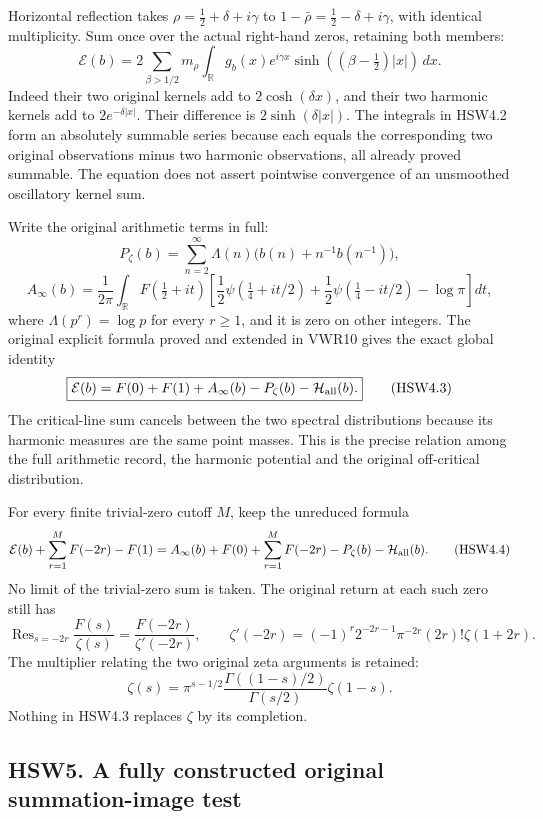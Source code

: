 Horizontal reflection takes \(\rho=\tfrac12+\delta+i\gamma\) to
\(1-\bar\rho=\tfrac12-\delta+i\gamma\), with identical multiplicity. Sum
once over the actual right-hand zeros, retaining both members: \[
\boxed{\mathcal E(b)=
2\sum_{\beta>1/2}m_\rho
\int_{\mathbb R}g_b(x)e^{i\gamma x}
\sinh((\beta-\tfrac12)|x|)\,dx.}
\tag{HSW4.2}
\] Indeed their two original kernels add to \(2\cosh(\delta x)\), and
their two harmonic kernels add to \(2e^{-\delta|x|}\). Their difference
is \(2\sinh(\delta|x|)\). The integrals in HSW4.2 form an absolutely
summable series because each equals the corresponding two original
observations minus two harmonic observations, all already proved
summable. The equation does not assert pointwise convergence of an
unsmoothed oscillatory kernel sum.

Write the original arithmetic terms in full: \[
P_\zeta(b)=\sum_{n=2}^\infty\Lambda(n)
\bigl(b(n)+n^{-1}b(n^{-1})\bigr),
\] \[
A_\infty(b)=\frac1{2\pi}\int_{\mathbb R}F(\tfrac12+it)
\left[
\frac12\psi(\tfrac14+it/2)+\frac12\psi(\tfrac14-it/2)-\log\pi
\right]dt,
\] where \(\Lambda(p^r)=\log p\) for every \(r\ge1\), and it is zero on
other integers. The original explicit formula proved and extended in
VWR10 gives the exact global identity \[
\boxed{\mathcal E(b)
=F(0)+F(1)+A_\infty(b)-P_\zeta(b)-\mathcal H_{\rm all}(b).}
\tag{HSW4.3}
\] The critical-line sum cancels between the two spectral distributions
because its harmonic measures are the same point masses. This is the
precise relation among the full arithmetic record, the harmonic
potential and the original off-critical distribution.

For every finite trivial-zero cutoff \(M\), keep the unreduced formula
\[
\mathcal E(b)+\sum_{r=1}^M F(-2r)-F(1)
=A_\infty(b)+F(0)+\sum_{r=1}^M F(-2r)
-P_\zeta(b)-\mathcal H_{\rm all}(b).
\tag{HSW4.4}
\] No limit of the trivial-zero sum is taken. The original return at
each such zero still has \[
\operatorname{Res}_{s=-2r}\frac{F(s)}{\zeta(s)}
=\frac{F(-2r)}{\zeta'(-2r)},\qquad
\zeta'(-2r)=(-1)^r2^{-2r-1}\pi^{-2r}(2r)!\zeta(1+2r).
\tag{HSW4.5}
\] The multiplier relating the two original zeta arguments is retained:
\[
\zeta(s)=
\pi^{s-1/2}\frac{\Gamma((1-s)/2)}{\Gamma(s/2)}\zeta(1-s).
\tag{HSW4.6}
\] Nothing in HSW4.3 replaces \(\zeta\) by its completion.

\subsection{HSW5. A fully constructed original summation-image
test}\label{hsw5.-a-fully-constructed-original-summation-image-test}

